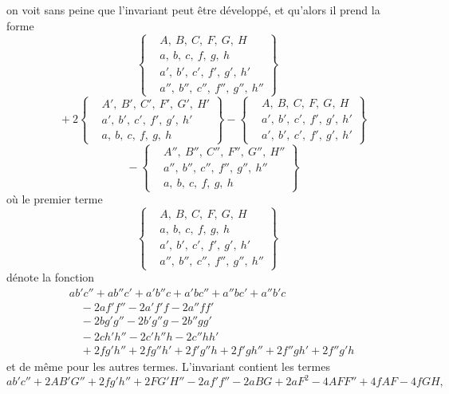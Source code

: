 \documentclass[11pt]{article}
\begin{document}
\noindent on voit sans peine que l'invariant peut \^etre d\'evelopp\'e, et qu'alors il prend la forme
\[
\left\{\begin{aligned} & A,\ B,\ C,\ F,\ G,\ H\\ & a,\ b,\ c,\ f,\ g,\ h\\ & a',\ b',\ c',\ f',\ g',\ h'\\ & a'',\ b'',\ c'',\ f'',\ g'',\ h''\end{aligned}\right\}
\]
\[
\quad + 2\left\{\begin{aligned} & A',\ B',\ C',\ F',\ G',\ H'\\ & a',\ b',\ c',\ f',\ g',\ h'\\ & a,\ b,\ c,\ f,\ g,\ h\end{aligned}\right\} - \left\{\begin{aligned} & A,\ B,\ C,\ F,\ G,\ H\\ & a',\ b',\ c',\ f',\ g',\ h'\\ & a',\ b',\ c',\ f',\ g',\ h'\end{aligned}\right\}
\]
\[
\quad - \left\{\begin{aligned} & A'',\ B'',\ C'',\ F'',\ G'',\ H''\\ & a'',\ b'',\ c'',\ f'',\ g'',\ h''\\ & a,\ b,\ c,\ f,\ g,\ h\end{aligned}\right\}
\]
o\`u le premier terme
\[
\left\{\begin{aligned} & A,\ B,\ C,\ F,\ G,\ H\\ & a,\ b,\ c,\ f,\ g,\ h\\ & a',\ b',\ c',\ f',\ g',\ h'\\ & a'',\ b'',\ c'',\ f'',\ g'',\ h''\end{aligned}\right\}
\]
d\'enote la fonction
\[
\begin{aligned}
   &a b' c'' + a b'' c' + a' b'' c + a' b c'' + a'' b c' + a'' b' c\\
   &\quad{} - 2 a f' f'' - 2 a' f' f - 2 a'' f f'\\
   &\quad{} - 2 b g' g'' - 2 b' g'' g - 2 b'' g g'\\
   &\quad{} - 2 c h' h'' - 2 c' h'' h - 2 c'' h h'\\
   &\quad{} + 2 f g' h'' + 2 f g'' h' + 2 f' g'' h + 2 f' g h'' + 2 f'' g h' + 2 f'' g' h
\end{aligned}
\]
et de m\^eme pour les autres termes. L'invariant contient les termes
\[
   a b' c'' + 2 A B' G'' + 2 f g' h'' + 2 F G' H'' - 2 a f' f'' - 2 a B G + 2 a F^2 - 4 A F F'' + 4 f A F - 4 f G H,
\]
\end{document}
